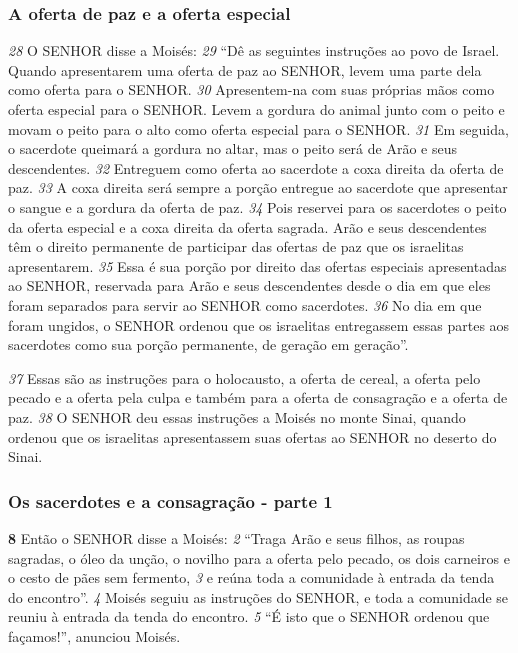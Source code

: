 \subsubsection*{A oferta de paz e a oferta especial}  
\textit{\tiny 28}
O SENHOR disse a Moisés: 
\textit{\tiny 29}
“Dê as seguintes instruções ao povo de Israel.
Quando apresentarem uma oferta de paz ao SENHOR, levem uma parte dela como
oferta para o SENHOR. 
\textit{\tiny 30}
Apresentem-na com suas próprias mãos como oferta
especial para o SENHOR. Levem a gordura do animal junto com o peito e movam o
peito para o alto como oferta especial para o SENHOR. 
\textit{\tiny 31}
Em seguida, o sacerdote
queimará a gordura no altar, mas o peito será de Arão e seus descendentes.
\textit{\tiny 32}
Entreguem como oferta ao sacerdote a coxa direita da oferta de paz. 
\textit{\tiny 33}
A coxa
direita será sempre a porção entregue ao sacerdote que apresentar o sangue e a
gordura da oferta de paz. 
\textit{\tiny 34}
Pois reservei para os sacerdotes o peito da oferta
especial e a coxa direita da oferta sagrada. Arão e seus descendentes têm o direito
permanente de participar das ofertas de paz que os israelitas apresentarem.
\textit{\tiny 35}
Essa é sua porção por direito das ofertas especiais apresentadas ao SENHOR,
reservada para Arão e seus descendentes desde o dia em que eles foram
separados para servir ao SENHOR como sacerdotes. 
\textit{\tiny 36}
No dia em que foram
ungidos, o SENHOR ordenou que os israelitas entregassem essas partes aos
sacerdotes como sua porção permanente, de geração em geração”.
   
\bigskip
\textit{\tiny 37}
Essas são as instruções para o holocausto, a oferta de cereal, a oferta pelo
pecado e a oferta pela culpa e também para a oferta de consagração e a oferta de
paz. 
\textit{\tiny 38}
O SENHOR deu essas instruções a Moisés no monte Sinai, quando ordenou
que os israelitas apresentassem suas ofertas ao SENHOR no deserto do Sinai.
   
\bigskip
\subsubsection*{Os sacerdotes e a consagração - parte 1}  
\textbf{\large 8} Então o SENHOR disse a Moisés: 
\textit{\tiny 2} 
“Traga Arão e seus filhos, as roupas sagradas,
o óleo da unção, o novilho para a oferta pelo pecado, os dois carneiros e o cesto de
pães sem fermento, 
\textit{\tiny 3} 
e reúna toda a comunidade à entrada da tenda do encontro”. 
\textit{\tiny 4} 
Moisés   seguiu as instruções do SENHOR, e toda a comunidade se reuniu à
entrada da tenda do encontro. 
\textit{\tiny 5} 
“É isto que o SENHOR ordenou que façamos!”,
anunciou Moisés. 

